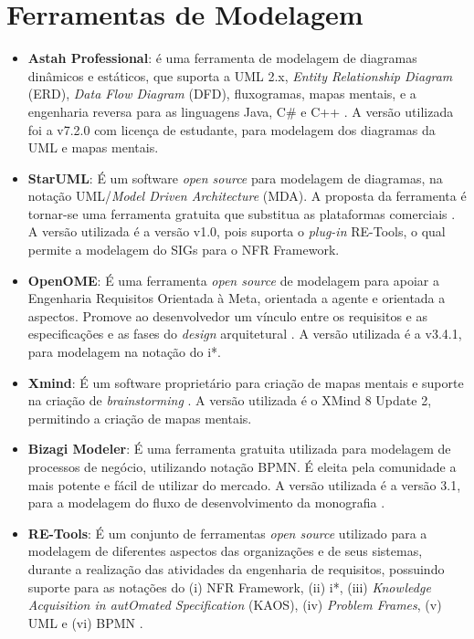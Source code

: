 \section{Ferramentas de Modelagem}
\label{sec:ferramentasModelagem}

\begin{itemize}
	\item \textbf{Astah Professional}: é uma ferramenta de modelagem de diagramas dinâmicos e estáticos, que suporta a UML 2.x, \textit{Entity Relationship Diagram} (ERD), \textit{Data Flow Diagram} (DFD), fluxogramas, mapas mentais, e a engenharia reversa para as linguagens Java, C\# e C++ \cite{astah}. A versão utilizada foi a v7.2.0 com licença de estudante, para modelagem dos diagramas da UML e mapas mentais.   
	
	\item \textbf{StarUML}: É um software \textit{open source} para modelagem de diagramas, na notação UML/\textit{Model Driven Architecture} (MDA). A proposta da ferramenta é tornar-se uma ferramenta gratuita que substitua as plataformas comerciais \cite{starUML}. A versão utilizada é a versão v1.0, pois suporta o \textit{plug-in} RE-Tools, o qual permite a modelagem do SIGs para o NFR Framework. 
	
	\item \textbf{OpenOME}: É uma ferramenta \textit{open source} de modelagem para apoiar a Engenharia Requisitos Orientada à Meta, orientada a agente e orientada a aspectos. Promove ao desenvolvedor um vínculo entre os requisitos e as especificações e as fases do \textit{design} arquitetural \cite{openOME}. A versão utilizada é a v3.4.1, para modelagem na notação do i*. 
	
	\item \textbf{Xmind}: É um software proprietário para criação de mapas mentais e suporte na criação de \textit{brainstorming} \cite{xMind}. A versão utilizada é o XMind 8 Update 2, permitindo a criação de mapas mentais. 
	
	\item \textbf{Bizagi Modeler}: É uma ferramenta gratuita utilizada para modelagem de processos de negócio, utilizando notação BPMN. É eleita pela comunidade a mais potente e fácil de utilizar do mercado. A versão utilizada é a versão 3.1, para a modelagem do fluxo de desenvolvimento da monografia \cite{bizagi}. 
	
	\item \textbf{RE-Tools}: É um conjunto de ferramentas \textit{open source} utilizado para a modelagem de diferentes aspectos das organizações e de seus sistemas, durante a realização das atividades da engenharia de requisitos, possuindo suporte para as notações do (i) NFR Framework, (ii) i*, (iii) \textit{Knowledge Acquisition in autOmated Specification} (KAOS), (iv) \textit{Problem Frames}, (v) UML e (vi) BPMN \cite{reTools} \cite{supakkul2012re}.
	

\end{itemize}
